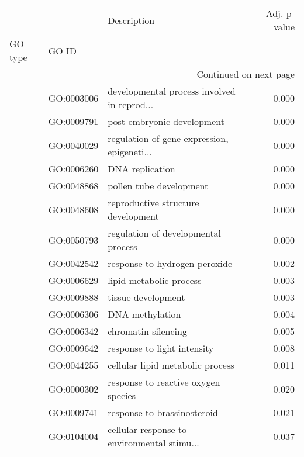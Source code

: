 \begin{longtable}{lllr}
\toprule
   &            &                                  Description &  Adj. p-value \\
GO type & GO ID &                                              &               \\
\midrule
\endhead
\midrule
\multicolumn{4}{r}{{Continued on next page}} \\
\midrule
\endfoot

\bottomrule
\endlastfoot
\multirow{25}{*}{BP} & GO:0003006 &  developmental process involved in reprod... &         0.000 \\
   & GO:0009791 &                   post-embryonic development &         0.000 \\
   & GO:0040029 &  regulation of gene expression, epigeneti... &         0.000 \\
   & GO:0006260 &                              DNA replication &         0.000 \\
   & GO:0048868 &                      pollen tube development &         0.000 \\
   & GO:0048608 &           reproductive structure development &         0.000 \\
   & GO:0050793 &          regulation of developmental process &         0.000 \\
   & GO:0042542 &                response to hydrogen peroxide &         0.002 \\
   & GO:0006629 &                      lipid metabolic process &         0.003 \\
   & GO:0009888 &                           tissue development &         0.003 \\
   & GO:0006306 &                              DNA methylation &         0.004 \\
   & GO:0006342 &                          chromatin silencing &         0.005 \\
   & GO:0009642 &                  response to light intensity &         0.008 \\
   & GO:0044255 &             cellular lipid metabolic process &         0.011 \\
   & GO:0000302 &          response to reactive oxygen species &         0.020 \\
   & GO:0009741 &                  response to brassinosteroid &         0.021 \\
   & GO:0104004 &  cellular response to environmental stimu... &         0.037 \\

\end{longtable}
